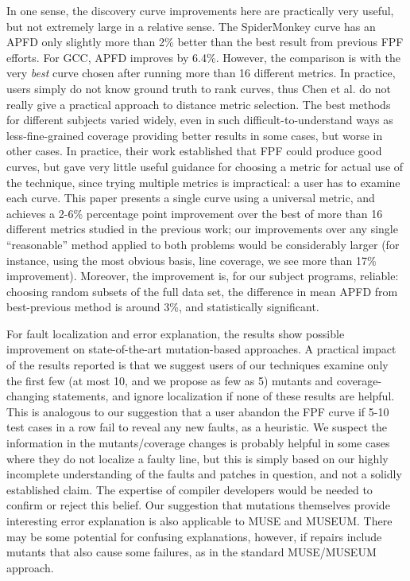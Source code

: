 In one sense, the discovery curve improvements here are practically very useful, but not extremely large in a relative sense.  The SpiderMonkey curve has an APFD only slightly more than 2\% better than the best result from previous FPF efforts.  For GCC, APFD improves by 6.4\%.  However, the comparison is with the very \emph{best} curve chosen after running more than 16 different metrics.  In practice, users simply do not know ground truth to rank curves, thus Chen et al. \cite{PLDI13} do not really give a practical approach to distance metric selection.  The best methods for different subjects varied widely, even in such difficult-to-understand ways as less-fine-grained coverage providing better results in some cases, but worse in other cases.   In practice, their work established that FPF could produce good curves, but gave very little useful guidance for choosing a metric for actual use of the technique, since trying multiple metrics is impractical: a user has to examine each curve.    This paper presents a single curve using a universal metric, and achieves a 2-6\% percentage point improvement over the best of more than 16 different metrics studied in the previous work; our improvements over any single ``reasonable'' method applied to both problems would be considerably larger (for instance, using the most obvious basis, line coverage, we see more than 17\% improvement).  Moreover, the improvement is, for our subject programs, reliable:  choosing random subsets of the full data set, the difference in mean APFD from best-previous method is around 3\%, and statistically significant.

For fault localization and error explanation, the results show possible improvement on state-of-the-art mutation-based approaches.  A practical impact of the results reported is that we suggest users of our techniques examine only the first few (at most 10, and we propose as few as 5) mutants and coverage-changing statements, and ignore localization if none of these results are helpful.  This is analogous to our suggestion that a user abandon the FPF curve if 5-10 test cases in a row fail to reveal any new faults, as a heuristic.  We suspect the information in the mutants/coverage changes is probably helpful in some cases where they do not localize a faulty line, but this is simply based on our highly incomplete understanding of the faults and patches in question, and not a solidly established claim.  The expertise of compiler developers would be needed to confirm or reject this belief.  Our suggestion that mutations themselves provide interesting error explanation is also applicable to MUSE and MUSEUM.  There may be some potential for confusing explanations, however, if repairs include mutants that also cause some failures, as in the standard MUSE/MUSEUM approach.  

